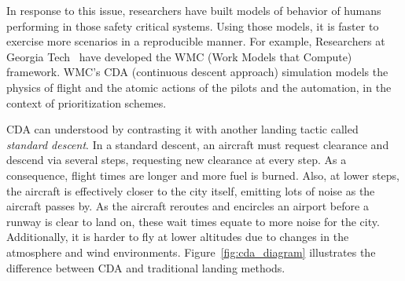 \documentclass[journal]{IEEEtran}
\newcommand{\fig}[1]{Figure~\ref{fig:#1}}
\begin{document}
In response to this issue, researchers have built
models of behavior of humans performing in those
safety critical systems.  Using those models, it is
faster to exercise more scenarios in a reproducible
manner.  For example, Researchers at Georgia
Tech~\cite{Kim2011,Pritchett2011,Feigh2012,Kim2013,Pritchett2014,Feigh2014}
have developed the WMC (Work Models that Compute)
framework.  WMC's CDA
  (continuous descent approach) simulation
  models the physics of flight and the atomic
  actions of the pilots and the automation, in the
  context of prioritization schemes.





CDA can  understood by contrasting it with
another landing tactic called {\em standard descent}.  
In a standard descent, an aircraft must request clearance and descend via several steps, requesting new clearance at every step.  
As a consequence, flight times are longer and more fuel is burned.  
Also, at lower steps, the aircraft is effectively closer to the city itself, emitting lots of noise as the aircraft passes by.
As the aircraft reroutes and encircles an airport before a runway is clear to land on, these wait times equate to more noise for the city.
Additionally, it is harder to fly at lower altitudes due to changes in the atmosphere and wind environments.
\fig{cda_diagram} illustrates the difference between CDA and traditional landing methods.
\end{document}
